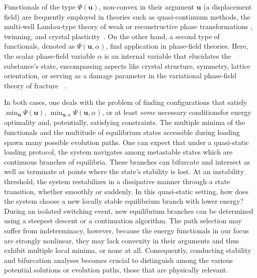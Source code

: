 \documentclass[10pt]{article}
\begin{document}
Functionals of the type $\Psi(\mathbf u)$, non-convex in their argument  $\mathbf u$ (a displacement field) are frequently employed in theories such as quasi-continuum methods, the multi-well Landau-type theory of weak or reconstructive phase transformations , twinning, and crystal plasticity~\cite{Tadmor1996-qi,Lookman2003-gd,Conti2004-yj,Finel2010-zw,Clayton2011-xq,Salman2019-cg,Baggio2019-rs,Baggio2023-qu}. On the other hand, a second type of functionals, denoted as $\Psi(\mathbf u, \alpha)$, find application in phase-field theories. Here, the scalar phase-field variable $\alpha$ is an internal variable that elucidates the substance's state, encompassing aspects like crystal structure, symmetry, lattice orientation, \cite{Finel2010-zw,Ruffini2015-pn,Javanbakht2016-dr} or serving as a damage parameter in the variational phase-field theory of fracture ~\cite{francfort_marigo1998,Salman2021-mn}. 

In both cases, one deals with the problem of finding  configurations that satisfy $\min_{\boldsymbol{u}} \Psi(\boldsymbol{u})$, $\min_{\boldsymbol{u},\alpha} \Psi(\boldsymbol{u},\alpha)$, or at least \emph{some} necessary conditionsfor energy optimality and, potentially, satisfying constraints. 
The multiple minima of the functionals and the multitude of equilibrium states accessible during loading spawn many possible evolution paths. One can expect that under a quasi-static loading protocol, the system navigates among metastable states which are continuous branches of equilibria. These branches can bifurcate and intersect as well as terminate at points where the state’s stability is lost.
%
At an instability threshold, the system restabilizes in a dissipative manner through a state transition, whether smoothly or suddenly.
In this quasi-static setting, how does the system choose a new locally stable equilibrium branch with lower energy?
During an isolated switching event, new equilibrium branches can be determined using a steepest descent or a continuation algorithm. The path selection may suffer from indeterminacy, however, because the energy functionals in our focus are strongly nonlinear, they may lack convexity in their arguments and thus exhibit multiple local minima, or none at all. Consequently, conducting stability and bifurcation analyses becomes crucial to distinguish among the various potential solutions or evolution paths, those that are physically relevant.
\end{document}

